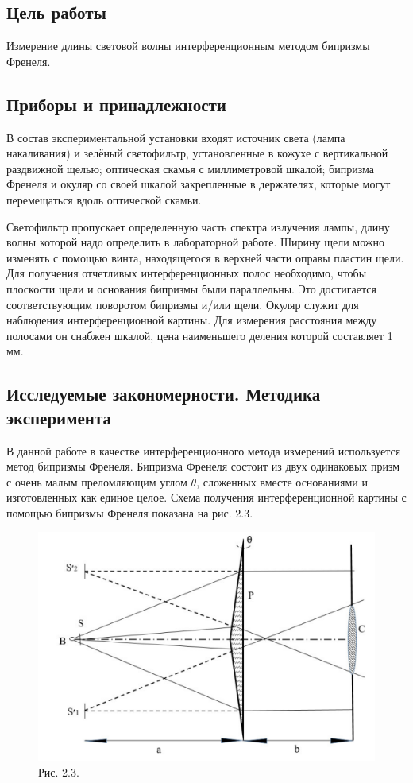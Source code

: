 \subsection*{Цель работы}
Измерение длины световой волны интерференционным методом бипризмы Френеля.

\subsection*{Приборы и принадлежности}
В состав экспериментальной установки входят источник света (лампа накаливания) и зелёный светофильтр, установленные в кожухе с вертикальной раздвижной щелью; оптическая скамья с миллиметровой шкалой; бипризма Френеля и окуляр со своей шкалой закрепленные в держателях, которые могут перемещаться вдоль оптической скамьи.

Светофильтр пропускает определенную часть спектра излучения лампы, длину волны которой надо определить в лабораторной работе. Ширину щели можно изменять с помощью винта, находящегося в верхней части оправы пластин щели. Для получения отчетливых интерференционных полос необходимо, чтобы плоскости щели и основания бипризмы были параллельны. Это достигается соответствующим поворотом бипризмы и/или щели. Окуляр служит для наблюдения интерференционной картины. Для измерения расстояния между полосами он снабжен шкалой, цена наименьшего деления которой составляет 1 мм.

\subsection*{Исследуемые закономерности. Методика эксперимента}

В данной работе в качестве интерференционного метода измерений используется метод бипризмы Френеля. Бипризма Френеля состоит из двух одинаковых призм с очень малым преломляющим углом $\theta$, сложенных вместе основаниями и изготовленных как единое целое. Схема получения интерференционной картины с помощью бипризмы Френеля показана на рис. 2.3.

\begin{figure}
    \centering
    \includegraphics[width=0.5\linewidth]{figs/2.3.png}
    \caption*{Рис. 2.3.}
    \label{fig:2.3.}
\end{figure}

